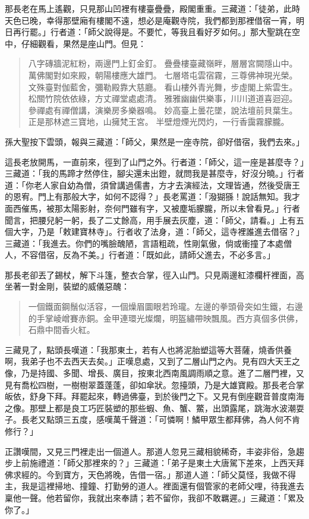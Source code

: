 那長老在馬上遙觀，只見那山凹裡有樓臺疊疊，殿閣重重。三藏道：「徒弟，此時天色已晚，幸得那壁廂有樓閣不遠，想必是庵觀寺院，我們都到那裡借宿一宵，明日再行罷。」行者道：「師父說得是。不要忙，等我且看好歹如何。」那大聖跳在空中，仔細觀看，果然是座山門。但見：
\begin{quote}
八字磚牆泥紅粉，兩邊門上釘金釘。
疊疊樓臺藏嶺畔，層層宮闕隱山中。
萬佛閣對如來殿，朝陽樓應大雄門。
七層塔屯雲宿霧，三尊佛神現光榮。
文殊臺對伽藍舍，彌勒殿靠大慈廳。
看山樓外青光舞，步虛閣上紫雲生。
松關竹院依依綠，方丈禪堂處處清。
雅雅幽幽供樂事，川川道道喜迴迎。
參禪處有禪僧講，演樂房多樂器鳴。
妙高臺上曇花墜，說法壇前貝葉生。
正是那林遮三寶地，山擁梵王宮。
半壁燈煙光閃灼，一行香靄霧朦朧。
\end{quote}

孫大聖按下雲頭，報與三藏道：「師父，果然是一座寺院，卻好借宿，我們去來。」

這長老放開馬，一直前來，徑到了山門之外。行者道：「師父，這一座是甚麼寺？」三藏道：「我的馬蹄才然停住，腳尖還未出鐙，就問我是甚麼寺，好沒分曉。」行者道：「你老人家自幼為僧，須曾講過儒書，方才去演經法，文理皆通，然後受唐王的恩宥。門上有那般大字，如何不認得？」長老罵道：「潑猢猻！說話無知。我才面西催馬，被那太陽影射，奈何門雖有字，又被塵垢朦朧，所以未曾看見。」行者聞言，把腰兒躬一躬，長了二丈餘高，用手展去灰塵，道：「師父，請看。」上有五個大字，乃是「敕建寶林寺」。行者收了法身，道：「師父，這寺裡誰進去借宿？」三藏道：「我進去。你們的嘴臉醜陋，言語粗疏，性剛氣傲，倘或衝撞了本處僧人，不容借宿，反為不美。」行者道：「既如此，請師父進去，不必多言。」

那長老卻丟了錫杖，解下斗篷，整衣合掌，徑入山門。只見兩邊紅漆欄杆裡面，高坐著一對金剛，裝塑的威儀惡醜：
\begin{quote}
一個鐵面鋼鬚似活容，一個燥眉圜眼若玲瓏。左邊的拳頭骨突如生鐵，右邊的手掌崚嶒賽赤銅。金甲連環光燦爛，明盔繡帶映飄風。西方真個多供佛，石鼎中間香火紅。
\end{quote}

三藏見了，點頭長嘆道：「我那東土，若有人也將泥胎塑這等大菩薩，燒香供養啊，我弟子也不去西天去矣。」正嘆息處，又到了二層山門之內。見有四大天王之像，乃是持國、多聞、增長、廣目，按東北西南風調雨順之意。進了二層門裡，又見有喬松四樹，一樹樹翠蓋蓬蓬，卻如傘狀。忽擡頭，乃是大雄寶殿。那長老合掌皈依，舒身下拜。拜罷起來，轉過佛臺，到於後門之下。又見有倒座觀音普度南海之像。那壁上都是良工巧匠裝塑的那些蝦、魚、蟹、鱉，出頭露尾，跳海水波潮耍子。長老又點頭三五度，感嘆萬千聲道：「可憐啊！鱗甲眾生都拜佛，為人何不肯修行？」

正讚嘆間，又見三門裡走出一個道人。那道人忽見三藏相貌稀奇，丰姿非俗，急趨步上前施禮道：「師父那裡來的？」三藏道：「弟子是東土大唐駕下差來，上西天拜佛求經的。今到寶方，天色將晚，告借一宿。」那道人道：「師父莫怪，我做不得主，我是這裡掃地、撞鐘、打勤勞的道人。裡面還有個管家的老師父哩，待我進去稟他一聲。他若留你，我就出來奉請；若不留你，我卻不敢羈遲。」三藏道：「累及你了。」

